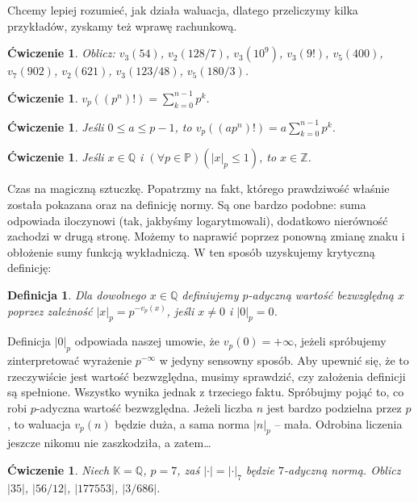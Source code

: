 \documentclass[a4paper,fleqn,9pt]{extarticle}
\newtheorem{prb}[prbh]{\'Cwiczenie}
\newtheorem{dff}{Definicja}
\begin{document}
Chcemy lepiej rozumieć, jak działa waluacja, dlatego przeliczymy kilka przykładów, zyskamy też wprawę rachunkową. 

\begin{prb}
Oblicz: $v_{3}(54)$, $v_{2}(128/7)$, $v_{3}(10^9)$, $v_3(9!)$, $v_5(400)$, $v_7(902)$, $v_2(621)$, $v_3(123/48)$, $v_5(180/3)$.
\end{prb}

\begin{prb}
$v_p((p^n)!) = \sum_{k=0}^{n-1}p^k$.
\end{prb}

\begin{prb}
Jeśli $0\le a\le p-1$, to $v_p((ap^n)!) = a\sum_{k=0}^{n-1}p^k$.
\end{prb}

\begin{prb}
Jeśli $x\in \mathbb Q$ i $(\forall p\in\mathbb P)(|x|_p \le 1)$, to $x\in\mathbb Z$.
\end{prb}

Czas na magiczną sztuczkę.
Popatrzmy na fakt, którego prawdziwość właśnie została pokazana oraz na definicję normy.
Są one bardzo podobne: suma odpowiada iloczynowi (tak, jakbyśmy logarytmowali), dodatkowo nierówność zachodzi w drugą stronę. 
Możemy to naprawić poprzez ponowną zmianę znaku i obłożenie sumy funkcją wykładniczą.
W ten sposób uzyskujemy krytyczną definicję:

\begin{dff}
Dla dowolnego $x\in\mathbb Q$ definiujemy $p$-adyczną wartość bezwzględną $x$ poprzez zależność $|x|_p = p^{-v_p(x)}$, jeśli $x\neq 0$ i $|0|_p = 0$.
\end{dff}

Definicja $|0|_p$ odpowiada naszej umowie, że $v_p(0) = + \infty$, jeżeli spróbujemy zinterpretować wyrażenie $p^{-\infty}$ w jedyny sensowny sposób.
Aby upewnić się, że to rzeczywiście jest wartość bezwzględna, musimy sprawdzić, czy założenia definicji są spełnione.
Wszystko wynika jednak z trzeciego faktu.
Spróbujmy pojąć to, co robi $p$-adyczna wartość bezwzględna. 
Jeżeli liczba $n$ jest bardzo podzielna przez $p$, to waluacja $v_p(n)$ będzie duża, a sama norma $|n|_p$ -- mała.
Odrobina liczenia jeszcze nikomu nie zaszkodziła, a zatem…

\begin{prb}
Niech $\mathbb K = \mathbb Q$, $p=7$, zaś $|\cdot| = |\cdot|_7$ będzie $7$-adyczną normą.
Oblicz $|35|$, $|56/12|$, $|177553|$, $|3/686|$.
\end{prb}
\end{document}
